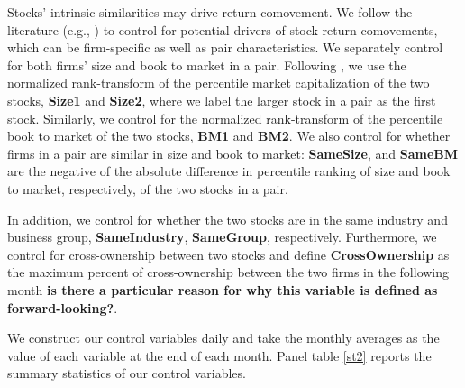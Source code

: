  Stocks' intrinsic similarities may drive return comovement. We follow the literature (e.g., \cite{AntonPolk}) to control for potential drivers of stock return comovements, which can be firm-specific as well as pair characteristics. We separately control for both firms' size and book to market in a pair. Following \cite{AntonPolk}, we use the normalized rank-transform of the percentile market capitalization of the two stocks, \textbf{Size1} and \textbf{Size2}, where we label the larger stock in a pair as the first stock. Similarly, we control for the normalized rank-transform of the percentile book to market of the two stocks, \textbf{BM1} and \textbf{BM2}. 
 We also control for whether firms in a pair are similar in size and book to market: \textbf{SameSize}, and \textbf{SameBM} are the negative of the absolute difference in percentile ranking of size and book to market, respectively, of the two stocks in a pair. 
 
 In addition, we control for whether the two stocks are in the same industry and business group, \textbf{SameIndustry}, \textbf{SameGroup}, respectively. Furthermore, we control for cross-ownership between two stocks and define  \textbf{CrossOwnership} as the maximum percent of cross-ownership between the two firms in the following month \textbf{ is there a particular reason for why this variable is defined as forward-looking?}.


%				



We construct our control variables daily and take the monthly averages as the value of each variable at the end of each month. Panel  table \ref{st2} reports the summary statistics of our control variables.


